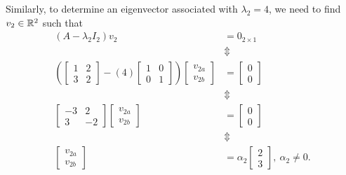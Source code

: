 \documentclass[letterpaper]{book}
\begin{document}
   Similarly, to determine an eigenvector associated with $ \lambda_2=4$, we need to find $v_2\in \mathbb R^2$ such that 
   \begin{align*}
       (A-\lambda_2 I_2) v_2 & = 0_{2 \times 1}\\
        & \Updownarrow \\
   \left( \left[\begin{array}{rr}
    1 & 2\\
    3 & 2
    \end{array}\right] - (4)   \left[\begin{array}{rr}
    1 & 0\\
    0& 1
    \end{array}\right]\right) \left[\begin{array}{r}
   v_{2a} \\
  v_{2b}
    \end{array}\right] & = \left[\begin{array}{r}
   0 \\
  0
    \end{array}\right]\\
     & \Updownarrow \\
      \left[\begin{array}{rr}
    -3 & 2\\
    3 & -2
    \end{array}\right]  \left[\begin{array}{r}
   v_{2a} \\
  v_{2b}
    \end{array}\right] & = \left[\begin{array}{r}
   0 \\
  0
    \end{array}\right]\\
    & \Updownarrow \\
   \left[\begin{array}{r}
   v_{2a} \\
  v_{2b}
    \end{array}\right] & = \alpha_2  \left[\begin{array}{r}
   2\\
 3
    \end{array}\right], ~\alpha_2 \neq 0.
   \end{align*}
    

\Qed

\newpage
\Large
\end{document}
